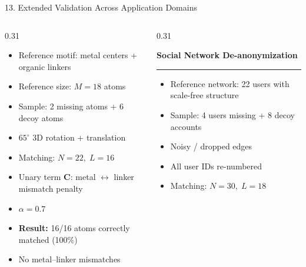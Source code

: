\documentclass[aspectratio=169, 11pt]{beamer}
\begin{document}
\begin{frame}{13. Extended Validation Across Application Domains}
\begin{columns}[T]
\begin{column}{0.31\textwidth}
\small
\begin{itemize}
\setlength\itemsep{0.35em}

\item Reference motif:
metal centers + organic linkers

\item Reference size:
$M=18$ atoms

\item Sample:
2 missing atoms + 6 decoy atoms

\item $65^\circ$ 3D rotation + translation

\item Matching:
$N=22,\;L=16$

\item Unary term $\mathbf{C}$:
metal $\leftrightarrow$ linker mismatch penalty

\item $\alpha=0.7$

\item \textbf{Result:}
16/16 atoms correctly matched
(100\%)

\item No metal--linker mismatches

\end{itemize}

\end{column}



\begin{column}{0.31\textwidth}

\textbf{Social Network De-anonymization}
\vspace{0.2em}
\hrule
\vspace{0.3em}

\small
\begin{itemize}
\setlength\itemsep{0.35em}

\item Reference network:
22 users with scale-free structure

\item Sample:
4 users missing + 8 decoy accounts

\item Noisy / dropped edges

\item All user IDs re-numbered

\item Matching:
$N=30,\;L=18$


\end{itemize}
\end{column}
\end{columns}
\end{frame}
\end{document}
